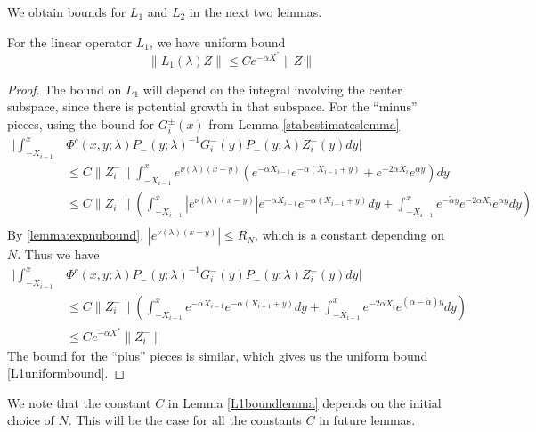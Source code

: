 \documentclass[thesis.tex]{subfiles}
\begin{document}
We obtain bounds for $L_1$ and $L_2$ in the next two lemmas.

\begin{lemma}\label{L1boundlemma}
For the linear operator $L_1$, we have uniform bound
\begin{equation}\label{L1uniformbound}
\|L_1(\lambda)Z\| \leq C e^{-\alpha X^*}\|Z\|
\end{equation}
\begin{proof}
The bound on $L_1$ will depend on the integral involving the center subspace, since there is potential growth in that subspace. For the ``minus'' pieces, using the bound for $G_i^\pm(x)$ from Lemma \ref{stabestimateslemma}
\begin{align*}
\Bigg| \int_{-X_{i-1}}^x &\Phi^c(x, y; \lambda) P_-(y; \lambda)^{-1} G_i^-(y) P_-(y; \lambda) Z_i^-(y) dy \Bigg| \\ 
&\leq C \| Z_i^-\|\int_{-X_{i-1}}^x e^{\nu(\lambda)(x - y)} \left( e^{-\alpha X_{i-1}} e^{-\alpha(X_{i-1} + y) } + e^{-2 \alpha X_i} e^{\alpha y} \right) dy \\
&\leq C \| Z_i^-\|\left( \int_{-X_{i-1}}^x \left|e^{\nu(\lambda)(x - y)}\right| e^{-\alpha X_{i-1}} e^{-\alpha(X_{i-1} + y) } dy + \int_{-X_{i-1}}^x e^{-\tilde{\alpha} y} e^{-2\alpha X_i} e^{\alpha y} dy \right) \\
\end{align*}
By \cref{lemma:expnubound}, $\left|e^{\nu(\lambda)(x - y)}\right| \leq R_N$, which is a constant depending on $N$. Thus we have
\begin{align*}
\Bigg| \int_{-X_{i-1}}^x &\Phi^c(x, y; \lambda) P_-(y; \lambda)^{-1} G_i^-(y) P_-(y; \lambda) Z_i^-(y) dy \Bigg| \\ 
&\leq C \| Z_i^-\|\left( \int_{-X_{i-1}}^x e^{-\alpha X_{i-1}} e^{-\alpha(X_{i-1} + y) } dy + \int_{-X_{i-1}}^x e^{-2\alpha X_i} e^{(\alpha - \tilde{\alpha}) y} dy \right) \\
&\leq C e^{-\alpha X^*} \| Z_i^-\| 
\end{align*}
The bound for the ``plus'' pieces is similar, which gives us the uniform bound \cref{L1uniformbound}.
\end{proof}
\end{lemma}

We note that the constant $C$ in Lemma \ref{L1boundlemma} depends on the initial choice of $N$. This will be the case for all the constants $C$ in future lemmas.
\end{document}
